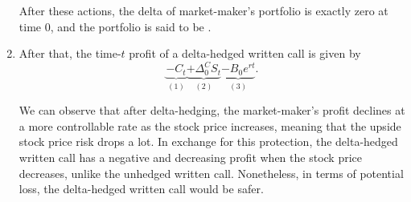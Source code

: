 \begin{enumerate}
After these actions, the delta of market-maker's portfolio is exactly zero at
time 0, and the portfolio is said to be .

\item \label{it:delta-hedging-profit-fmla}
After that, the time-\(t\) profit of a delta-hedged written call is given
by
\[
\underbrace{-C_t}_{(1)}\underbrace{+\Delta_0^CS_t}_{(2)}\underbrace{-B_0e^{rt}}_{(3)}.
\]
\begin{center}
\end{center}

We can observe that after delta-hedging, the market-maker's profit declines at
a more controllable rate as the stock price increases, meaning that the upside
stock price risk drops a lot. In exchange for this protection, the delta-hedged
written call has a negative and decreasing profit when the stock price
decreases, unlike the unhedged written call. Nonetheless, in terms of potential
loss, the delta-hedged written call would be safer.
\end{enumerate}
